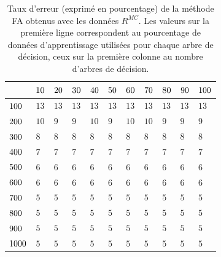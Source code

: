 \begin{table}[htb]
\caption{Taux d'erreur (exprimé en pourcentage) de la méthode FA obtenus avec les données  $R^{MC}$. Les valeurs sur la première ligne correspondent au pourcentage de données d'apprentissage utilisées pour chaque arbre de décision, ceux sur la première colonne au nombre d'arbres de décision.}
\centering
\begin{tabular}{| p{0.7cm} | p{0.5cm} |p{0.5cm} |p{0.5cm} |p{0.5cm} |p{0.5cm} |p{0.5cm} |p{0.5cm} |p{0.5cm} |p{0.5cm} |p{0.5cm} |}
\hline
&$\cellcolor{gris}{10}$&$\cellcolor{gris}{20}$&$\cellcolor{gris}{30}$&$\cellcolor{gris}{40}$&$\cellcolor{gris}{50}$&$\cellcolor{gris}{60}$&$\cellcolor{gris}{70}$&$\cellcolor{gris}{80}$&$\cellcolor{gris}{90}$&$\cellcolor{gris}{100}$\\
\hline
$\cellcolor{gris}{100}$ & $13$ & $13$ & $13$ & $13$ & $13$ & $13$ & $13$ & $13$ & $13$ & $13$ \\
\hline
$\cellcolor{gris}{200}$ & $10$ & $9$ & $9$ & $10$ & $9$ & $10$ & $10$ & $9$ & $9$ & $9$ \\
\hline
$\cellcolor{gris}{300}$ & $8$ & $8$ & $8$ & $8$ & $8$ & $8$ & $8$ & $8$ & $8$ & $8$ \\
\hline
$\cellcolor{gris}{400}$ & $7$ & $7$ & $7$ & $7$ & $7$ & $7$ & $7$ & $7$ & $7$ & $7$ \\
\hline
$\cellcolor{gris}{500}$ & $6$ & $6$ & $6$ & $6$ & $6$ & $6$ & $6$ & $6$ & $6$ & $6$ \\
\hline
$\cellcolor{gris}{600}$ & $6$ & $6$ & $6$ & $6$ & $6$ & $6$ & $6$ & $6$ & $6$ & $6$ \\
\hline
$\cellcolor{gris}{700}$ & $5$ & $5$ & $5$ & $5$ & $5$ & $5$ & $5$ & $5$ & $5$ & $5$ \\
\hline
$\cellcolor{gris}{800}$ & $5$ & $5$ & $5$ & $5$ & $5$ & $5$ & $5$ & $5$ & $5$ & $5$ \\
\hline
$\cellcolor{gris}{900}$ & $5$ & $5$ & $5$ & $5$ & $5$ & $5$ & $5$ & $5$ & $5$ & $5$ \\
\hline
$\cellcolor{gris}{1000}$ & $5$ & $5$ & $5$ & $5$ & $5$ & $5$ & $5$ & $5$ & $5$ & $5$ \\
\hline
\end{tabular}
\label{tab:saf:fa_mc_precision}
\end{table}

